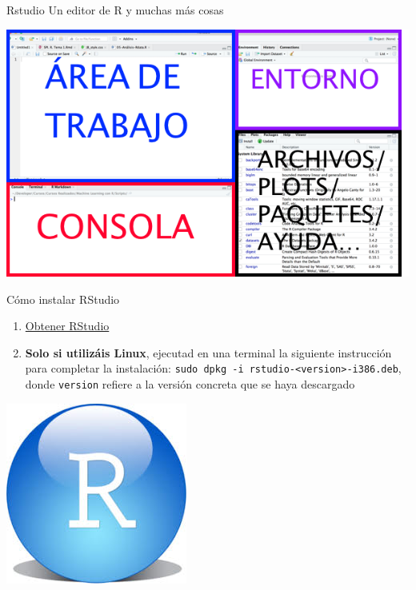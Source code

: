 \documentclass[
  ignorenonframetext,
]{beamer}
\providecommand{\tightlist}{%
  \setlength{\itemsep}{0pt}\setlength{\parskip}{0pt}}
\begin{document}
\begin{frame}{Rstudio}
\label{rstudio}
Un editor de R y muchas más cosas

\includegraphics[width=0.9\linewidth]{Imgs/InterfazRStudio}
\end{frame}

\begin{frame}[fragile]{Cómo instalar RStudio}
\label{cuxf3mo-instalar-rstudio}
\begin{enumerate}
\tightlist
\item
  \href{http://www.rstudio.com/products/rstudio/download/}{Obtener
  RStudio}
\item
  \textbf{Solo si utilizáis Linux}, ejecutad en una terminal la
  siguiente instrucción para completar la instalación:
  \texttt{sudo\ dpkg\ -i\ rstudio-\textless{}version\textgreater{}-i386.deb},
  donde \texttt{version} refiere a la versión concreta que se haya
  descargado
\end{enumerate}

\begin{center}\includegraphics[width=0.7\linewidth]{Imgs/RSLogo} \end{center}
\end{frame}
\end{document}
